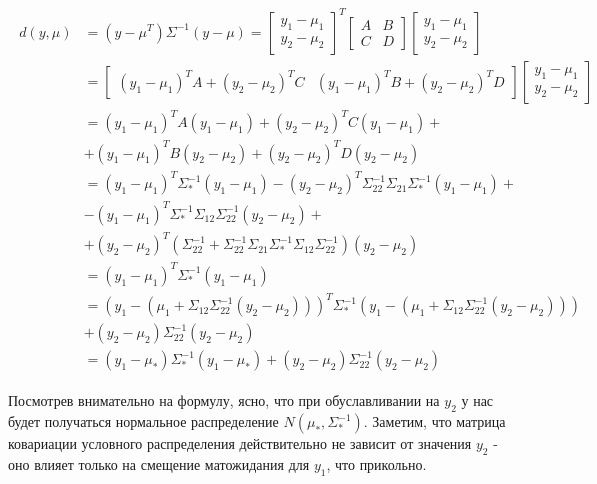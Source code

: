\documentclass[fleqn]{article}
\numberwithin{equation}{section}
\numberwithin{theorem}{section}
\numberwithin{figure}{section}
\numberwithin{lemma}{section}
\numberwithin{corollary}{section}
\begin{document}
 \begin{align}
 	\begin{split}
 	d(y, \mu) &= (y - \mu^T)\Sigma^{-1}(y-\mu) = \begin{bmatrix}
 		y_1 - \mu_1  \\
 		y_2 - \mu_2 
 	\end{bmatrix}^T
  \begin{bmatrix}
  	A & B \\
  	C & D
 \end{bmatrix}
\begin{bmatrix}
	y_1 - \mu_1  \\
	y_2 - \mu_2 
\end{bmatrix} \\
&= \begin{bmatrix}
	(y_1 - \mu_1)^TA + (y_2 - \mu_2)^TC & (y_1 - \mu_1)^TB + (y_2 - \mu_2)^TD 
\end{bmatrix}
\begin{bmatrix}
	y_1 - \mu_1  \\
	y_2 - \mu_2 
\end{bmatrix} \\
&= (y_1 - \mu_1)^TA(y_1 - \mu_1) + (y_2 - \mu_2)^TC(y_1 - \mu_1) +  \\
&+ (y_1 - \mu_1)^TB(y_2 - \mu_2) + (y_2 - \mu_2)^TD(y_2 - \mu_2)\\
&= (y_1 - \mu_1)^T\Sigma_*^{-1}(y_1 - \mu_1) -(y_2 - \mu_2)^T\Sigma_{22}^{-1}\Sigma_{21}\Sigma_*^{-1}(y_1 - \mu_1) +  \\
&- (y_1 - \mu_1)^T\Sigma_*^{-1}\Sigma_{12}\Sigma_{22}^{-1}(y_2 - \mu_2) +\\
&+ (y_2 - \mu_2)^T(\Sigma_{22}^{-1} + \Sigma_{22}^{-1} \Sigma_{21}\Sigma_*^{-1}\Sigma_{12}\Sigma_{22}^{-1})(y_2 - \mu_2)\\
 &= (y_1 - \mu_1)^T\Sigma_*^{-1}(y_1 - \mu_1)\\
 &= (y_1 - (\mu_1 + \Sigma_{12}\Sigma_{22}^{-1}(y_2 - \mu_2)))^T \Sigma_*^{-1} (y_1 - (\mu_1 + \Sigma_{12}\Sigma_{22}^{-1}(y_2 - \mu_2))) \\
 &+ (y_2 - \mu_2) \Sigma_{22}^{-1}(y_2 - \mu_2)\\
 &= (y_1 - \mu_*)\Sigma_*^{-1}(y_1 - \mu_*) +  (y_2 - \mu_2) \Sigma_{22}^{-1}(y_2 - \mu_2)
\end{split}
 \end{align}

Посмотрев внимательно на формулу, ясно, что при обуславливании на $y_2$ у нас будет получаться нормальное распределение $N(\mu_*, \Sigma_*^{-1})$. Заметим, что матрица ковариации условного распределения действительно не зависит от значения $y_2$ - оно влияет только на смещение матожидания для $y_1$, что прикольно. 
\end{document}
